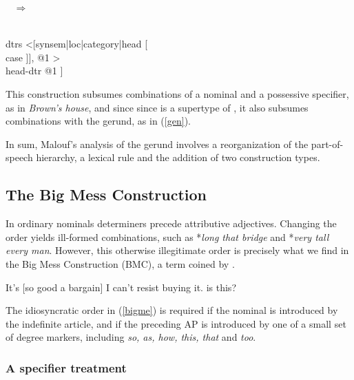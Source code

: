 \documentclass[output=paper
                ,modfonts
                ,nonflat
	        ,collection
	        ,collectionchapter
	        ,collectiontoclongg
 	        ,biblatex
                ,babelshorthands
                ,newtxmath
                ,draftmode
                ,colorlinks, citecolor=brown
]{./langsci/langscibook}
\begin{document}
\begin{exe} 
\ex\label{gencx} 
 ~ $\Rightarrow$ ~ 
\begin{avm} 
[synsem|loc [category|head \type{noun}                    \\
             content \type{scope-object}]                 \\
 dtrs <[synsem|loc|category|head [             \\
                                  case ]], @1 > \\
 head-dtr @1 ] 
\end{avm}
\end{exe}
 
\noindent
This construction subsumes combinations of a nominal and a 
possessive specifier, as in \emph{Brown's house}, and since 
since  is a supertype of ,  
it also subsumes combinations with the gerund, as in (\ref{gen}). 

In sum, Malouf's analysis of the gerund involves a reorganization of the 
part-of-speech hierarchy, a lexical rule and the addition of two construction types.     



\subsection{The Big Mess Construction} 
\label{bime}  


In ordinary nominals determiners precede attributive adjectives. Changing the order 
yields ill-formed combinations, such as *\emph{long that bridge} and *\emph{very tall every man}. 
However, this otherwise illegitimate order is precisely what we find in 
the Big Mess Construction (BMC), a term coined by \citet{Berman74}.  

\begin{exe}
\ex\label{bigme}
\begin{xlist}
\ex   It's [so good a bargain] I can't resist buying it.
 is this?
\end{xlist}
\end{exe} 

\noindent
The idiosyncratic order in (\ref{bigme}) is required if the nominal is introduced 
by the indefinite article, and if the preceding AP is introduced by one of a small 
set of degree markers, including \emph{so, as, how, this, that} and \emph{too}. 


\subsubsection{A specifier treatment} 
\end{document}
